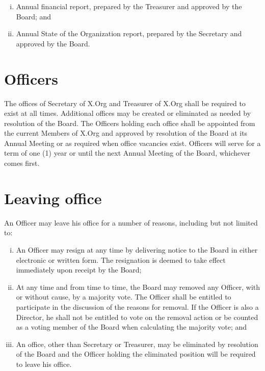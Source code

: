 \documentclass[10pt, english]{bylaws}
\begin{document}
\begin{enumerate}[(i)\hspace{.2cm}]
	\item Annual financial report, prepared by the Treasurer and approved by
	the Board; and

	\item Annual State of the Organization report, prepared by the Secretary
	and approved by the Board.
\end{enumerate}

\section{Officers}
The offices of Secretary of X.Org and Treasurer of X.Org shall be required
to exist at all times.  Additional offices may be created or eliminated as
needed by resolution of the Board.  The Officers holding each office shall be
appointed from the current Members of X.Org and approved by resolution of the
Board at its Annual Meeting or as required when office vacancies exist.
Officers will serve for a term of one (1) year or until the next Annual Meeting
of the Board, whichever comes first.

\section{Leaving office}
An Officer may leave his office for a number of reasons, including but not
limited to:

\begin{enumerate}[(i)\hspace{.2cm}]
	\item An Officer may resign at any time by delivering notice to the
	Board in either electronic or written form.  The resignation is deemed
	to take effect immediately upon receipt by the Board;

	\item At any time and from time to time, the Board may removed any
	Officer, with or without cause, by a majority vote.  The Officer shall
	be entitled to participate in the discussion of the reasons for removal.
	If the Officer is also a Director, he shall not be entitled to vote on
	the removal action or be counted as a voting member of the Board when
	calculating the majority vote; and

	\item An office, other than Secretary or Treasurer, may be eliminated by
	resolution of the Board and the Officer holding the eliminated position
	will be required to leave his office.

\end{enumerate}
\end{document}
